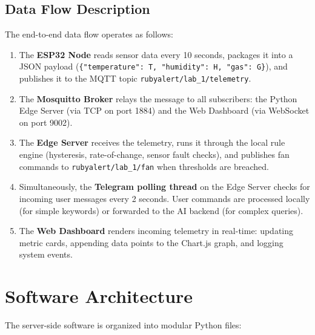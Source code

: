 \documentclass[12pt,a4paper]{report}
\begin{document}
\subsection{Data Flow Description}
The end-to-end data flow operates as follows:
\begin{enumerate}[leftmargin=2cm]
    \item The \textbf{ESP32 Node} reads sensor data every 10 seconds, packages it into a JSON payload (\texttt{\{"temperature": T, "humidity": H, "gas": G\}}), and publishes it to the MQTT topic \texttt{rubyalert/lab\_1/telemetry}.
    \item The \textbf{Mosquitto Broker} relays the message to all subscribers: the Python Edge Server (via TCP on port 1884) and the Web Dashboard (via WebSocket on port 9002).
    \item The \textbf{Edge Server} receives the telemetry, runs it through the local rule engine (hysteresis, rate-of-change, sensor fault checks), and publishes fan commands to \texttt{rubyalert/lab\_1/fan} when thresholds are breached.
    \item Simultaneously, the \textbf{Telegram polling thread} on the Edge Server checks for incoming user messages every 2 seconds. User commands are processed locally (for simple keywords) or forwarded to the AI backend (for complex queries).
    \item The \textbf{Web Dashboard} renders incoming telemetry in real-time: updating metric cards, appending data points to the Chart.js graph, and logging system events.
\end{enumerate}

\section{Software Architecture}
\label{sec:software_arch}

The server-side software is organized into modular Python files:
\end{document}
